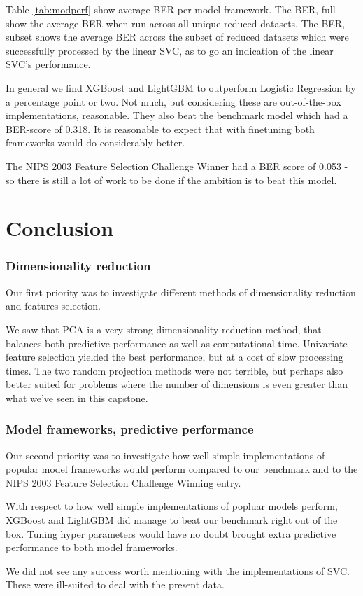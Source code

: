 \documentclass[12pt]{article}
\begin{document}
Table \ref{tab:modperf} show average BER per model framework. The BER, full show the average BER when run across all unique reduced datasets. The BER, subset shows the average BER across the subset of reduced datasets which were successfully processed by the linear SVC, as to go an indication of the linear SVC's performance.

In general we find XGBoost and LightGBM to outperform Logistic Regression by a percentage point or two. Not much, but considering these are out-of-the-box implementations, reasonable. They also beat the benchmark model which had a BER-score of 0.318. It is reasonable to expect that with finetuning both frameworks would do considerably better.

The NIPS 2003 Feature Selection Challenge Winner had a BER score of 0.053 - so there is still a lot of work to be done if the ambition is to beat this model.

\section{Conclusion}

\subsubsection{Dimensionality reduction}

Our first priority was to investigate different methods of dimensionality reduction and features selection.

We saw that PCA is a very strong dimensionality reduction method, that balances both predictive performance as well as computational time. Univariate feature selection yielded the best performance, but at a cost of slow processing times. The two random projection methods were not terrible, but perhaps also better suited for problems where the number of dimensions is even greater than what we've seen in this capstone.

\subsubsection{Model frameworks, predictive performance}

Our second priority was to investigate how well simple implementations of popular model frameworks would perform compared to our benchmark and to the NIPS 2003 Feature Selection Challenge Winning entry.

With respect to how well simple implementations of popluar models perform, XGBoost and LightGBM did manage to beat our benchmark right out of the box. Tuning hyper parameters would have no doubt brought extra predictive performance to both model frameworks. 

We did not see any success worth mentioning with the implementations of SVC. These were ill-suited to deal with the present data.




\end{document}
